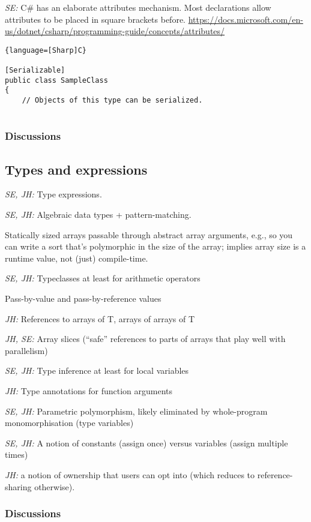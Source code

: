 \documentclass{article}
\begin{document}
\textit{SE:} C\# has an elaborate attributes mechanism.
Most declarations allow attributes to be placed in square brackets before.  \url{https://docs.microsoft.com/en-us/dotnet/csharp/programming-guide/concepts/attributes/}

\begin{lstlisting}{language=[Sharp]C}
 
[Serializable]
public class SampleClass
{
    // Objects of this type can be serialized.
 
\end{lstlisting}

\subsubsection{Discussions}

\subsection{Types and expressions}

\textit{SE, JH:} Type expressions.

\textit{SE, JH:} Algebraic data types + pattern-matching.

Statically sized arrays passable through abstract array arguments, e.g., so you
can write a sort that's polymorphic in the size of the array; implies array size
is a runtime value, not (just) compile-time.

\textit{SE, JH:} Typeclasses at least for arithmetic operators

Pass-by-value and pass-by-reference values

\textit{JH:} References to arrays of T, arrays of arrays of T

\textit{JH, SE:} Array slices (``safe'' references to parts of arrays that play
well with parallelism)

\textit{SE, JH:} Type inference at least for local variables

\textit{JH:} Type annotations for function arguments

\textit{SE, JH:} Parametric polymorphism, likely eliminated by whole-program
monomorphisation (type variables)

\textit{SE, JH:} A notion of constants (assign once) versus variables (assign
multiple times)

\textit{JH:} a notion of ownership that users can opt into (which reduces to
reference-sharing otherwise).

\subsubsection{Discussions}
\end{document}
